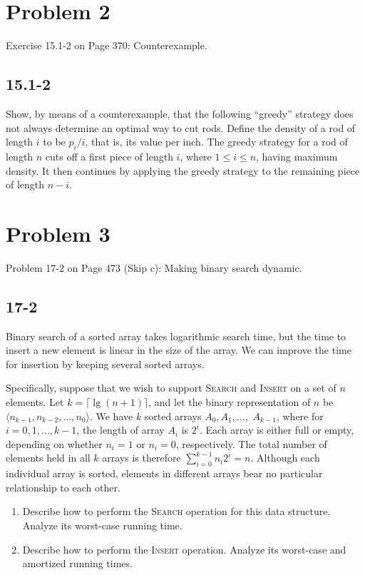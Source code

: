 \documentclass{../../class}
\begin{document}
\newpage
\section*{Problem 2}
\begin{tcolorbox}
    Exercise 15.1-2 on Page 370: Counterexample.
\end{tcolorbox}
\subsection*{15.1-2}
Show, by means of a counterexample, that the following \enquote{greedy}
strategy does not always determine an optimal way to cut rods. Define the density of a rod of length $i$ to be $p_i/i$, that is, its value per inch. The greedy strategy for a rod of length $n$ cuts off a first piece of length $i$, where $1 \leq i \leq n$, having maximum density. It then continues by applying the greedy strategy to the remaining piece of length $n - i$.

\newpage
\section*{Problem 3}
\begin{tcolorbox}
    Problem 17-2 on Page 473 (Skip c): Making binary search dynamic.
\end{tcolorbox}
\subsection*{17-2}
Binary search of a sorted array takes logarithmic search time, but the time to insert a new element is linear in the size of the array. We can improve the time for insertion by keeping several sorted arrays.

Specifically, suppose that we wish to support \textsc{Search} and \textsc{Insert} on a set of $n$ elements. Let $k = \lceil \lg{(n+1)} \rceil $, and let the binary representation of $n$ be $\langle n_{k-1}, n_{k-2}, \dots, n_0 \rangle $. We have $k$ sorted arrays $A_0, A_1, \dots,$ $A_{k-1}$, where for $i = 0, 1, \dots, k-1$, the length of array $A_i$ is $2^i$. Each array is either full or empty, depending on whether $n_i = 1$ or $n_i = 0$, respectively. The total number of elements held in all $k$ arrays is therefore $\sum_{i=0}^{k-1} n_i2^i = n$. Although each individual array is sorted, elements in different arrays bear no particular relationship to each other.
\begin{enumerate}
    \item Describe how to perform the \textsc{Search} operation for this data structure. Analyze its worst-case running time.
    \item Describe how to perform the \textsc{Insert} operation. Analyze its worst-case and amortized running times.
\end{enumerate}
\end{document}
